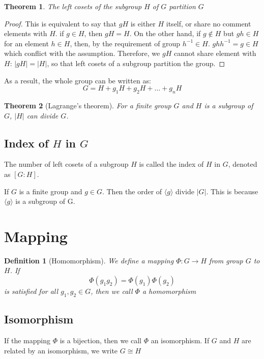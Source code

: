\documentclass{amsart}
\newtheorem{definition}{Definition}
\newtheorem{theorem}{Theorem}
\begin{document}
\vspace{10pt}

\begin{theorem}
    The left cosets of the subgroup $H$ of $G$ partition $G$
\end{theorem}
\begin{proof}
    This is equivalent to say that $gH$ is either $H$ itself, or share no comment elements with $H$.
    if $g\in H$, then $gH = H$. On the other hand, 
    if $g\notin H$ but $gh \in H$ for an element $h\in H$, then, by the requirement of group $h^{-1}\in H$. $ghh^{-1} = g \in H$ which conflict with the assumption.
    Therefore, we $gH$ cannot share element with $H$: $|gH| = |H|$, so that left cosets of a subgroup partition the group.
\end{proof}
As a result, the whole group can be written as:
\[
    G = H + g_1 H + g_2 H + \dots + g_n H    
\]
\begin{theorem}[Lagrange's theorem]
    For a finite group $G$ and $H$ is a subgroup of $G$, $|H|$ can divide $G$.
\end{theorem}
\subsection*{Index of $H$ in $G$}
    The number of left cosets of a subgroup $H$ is called the index of $H$ in $G$, denoted as $[G:H]$.

If $G$ is a finite group and $g\in G$. Then the order of $\langle g\rangle$ divide $|G|$. This is because 
$\langle g\rangle$ is a subgroup of G.

\section*{Mapping}

\begin{definition}[Homomorphism]
    We define a mapping $\Phi\colon G \to H$ from group $G$ to $H$. If
    \[
        \Phi(g_1 g_2) = \Phi(g_1) \Phi(g_2)    
    \] 
    is satisfied for all $g_1, g_2 \in G$, then we call $\Phi$ a homomorphism
\end{definition}

\subsection*{Isomorphism}
    If the mapping $\Phi$ is a bijection, then we call $\Phi$ an isomorphism. If $G$ and $H$ are related by 
    an isomorphism, we write $G\cong H$
\end{document}
